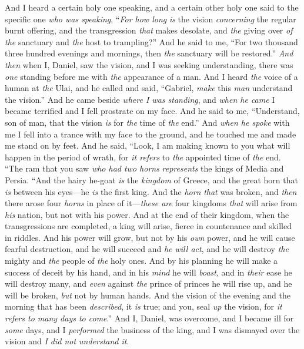 \begin{biblechapter}
\verse And I heard a certain holy one speaking, and a certain other holy one said to the specific one \textit{who was speaking}, “\textit{For how long} \textit{is} the vision \textit{concerning} the regular burnt offering, and the transgression \textit{that} makes desolate, and \textit{the} giving over \textit{of the} sanctuary and \textit{the} host to trampling?”
\verse And he said to me, “For two thousand three hundred evenings and mornings, then \textit{the} sanctuary will be restored.”
 \textit{And then} when I, Daniel, saw the vision, and I was seeking understanding, there was \textit{one} standing before me with \textit{the} appearance of a man.
\verse And I heard \textit{the} voice of a human at \textit{the} Ulai, and he called and said, “Gabriel, \textit{make} this \textit{man} understand the vision.”
\verse And he came beside \textit{where I was standing}, and \textit{when he came} I became terrified and I fell prostrate on my face. And he said to me, “Understand, son of man, that the vision \textit{is} for \textit{the} time of \textit{the} end.”
\verse And \textit{when he spoke} with me I fell into a trance with my face to the ground, and he touched me and made me stand on by feet.
\verse And he said, “Look, I am making known to you what will happen in the period of wrath, for \textit{it refers} to \textit{the} appointed time of \textit{the} end.
\verse “The ram that you saw \textit{who had two horns} \textit{represents} the kings of Media and Persia.
\verse “And the hairy he-goat \textit{is} the \textit{kingdom} of Greece, and the great horn that \textit{is} between his eyes—he \textit{is} the first king.
\verse And the \textit{horn} \textit{that} was broken, and \textit{then} there arose four \textit{horns} in place of it—\textit{these are} four kingdoms \textit{that} will arise from \textit{his} nation, but not with his power.
\verse And at the end of their kingdom, when the transgressions are completed, a king will arise, fierce in countenance and skilled in riddles.
\verse And his power will grow, but not by his \textit{own} power, and he will cause fearful destruction, and he will succeed and \textit{he will act}, and he will destroy \textit{the} mighty and \textit{the} people of \textit{the} holy ones.
\verse And by his planning he will make a success of deceit by his hand, and in his \textit{mind} he will \textit{boast}, and in \textit{their} ease he will destroy many, and \textit{even} against \textit{the} prince of princes he will rise up, and he will be broken, \textit{but} not by human hands.
\verse And the vision of the evening and the morning that has been \textit{described}, it \textit{is} true; and you, seal \textit{up} the vision, for \textit{it refers to many days to come}.”
\verse And I, Daniel, was overcome, and I became ill for \textit{some} days, and I \textit{performed} the business of the king, and I was dismayed over the vision and \textit{I did not understand it}.
\end{biblechapter}

